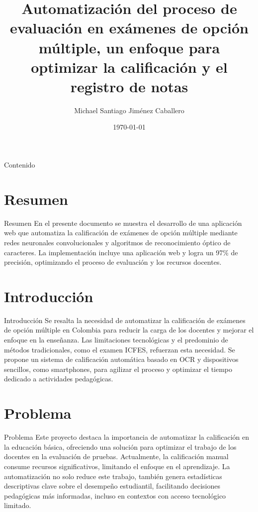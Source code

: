 \documentclass{beamer}
\title{Automatización del proceso de evaluación en exámenes de opción múltiple, un enfoque para optimizar la calificación y el registro de notas}
\author{Michael Santiago Jiménez Caballero}
\date{\today}
\begin{document}

\frame{\titlepage}
\begin{frame}{Contenido}
    \tableofcontents
\end{frame}

\section{Resumen}
\begin{frame}{Resumen}
    En el presente documento se muestra el desarrollo de una aplicación web que automatiza la  calificación de exámenes de
    opción múltiple mediante redes neuronales convolucionales y  algoritmos de 
    reconocimiento óptico de caracteres. La implementación incluye una aplicación
    web y logra un 97\% de precisión, optimizando el proceso de evaluación y los recursos docentes.
\end{frame}

\section{Introducción}
\begin{frame}{Introducción}
    Se resalta la necesidad de automatizar la calificación de exámenes de opción múltiple en Colombia para reducir 
    la carga de los docentes y mejorar el enfoque en la enseñanza. Las limitaciones tecnológicas y el predominio 
    de métodos tradicionales, como el examen ICFES, refuerzan esta necesidad. Se propone un sistema de 
    calificación automática basado en OCR y dispositivos sencillos, como smartphones, para agilizar el 
    proceso y optimizar el tiempo dedicado a actividades pedagógicas.    
\end{frame}

\section{Problema}
\begin{frame}{Problema}
    Este proyecto destaca la importancia de automatizar la calificación en la educación básica, ofreciendo 
    una solución para optimizar el trabajo de los docentes en la evaluación de pruebas. Actualmente, 
    la calificación manual consume recursos significativos, limitando el enfoque en el aprendizaje. 
    La automatización no solo reduce este trabajo, también genera estadísticas descriptivas clave 
    sobre el desempeño estudiantil, facilitando decisiones pedagógicas más informadas, incluso en
     contextos con acceso tecnológico limitado.
\end{frame}
\end{document}
